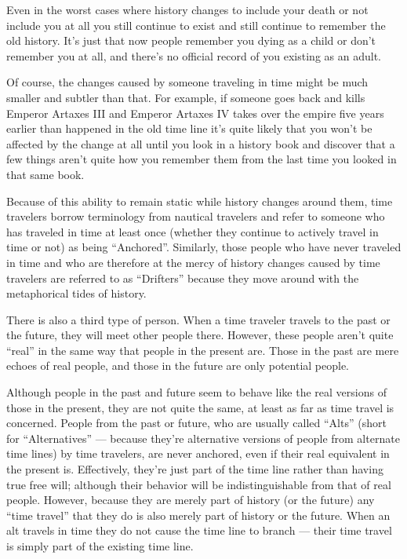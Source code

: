 \begin{multicols*}{2}
Even in the worst cases where history changes to include your death or not include you at all you still continue to exist and still continue to remember the old history. It’s just that now people remember you dying as a child or don’t remember you at all, and there’s no official record of you existing as an adult.

Of course, the changes caused by someone traveling in time might be much smaller and subtler than that. For example, if someone goes back and kills Emperor Artaxes III and Emperor Artaxes IV takes over the empire five years earlier than happened in the old time line it’s quite likely that you won’t be affected by the change at all until you look in a history book and discover that a few things aren’t quite how you remember them from the last time you looked in that same book.

Because of this ability to remain static while history changes around them, time travelers borrow terminology from nautical travelers and refer to someone who has traveled in time at least once (whether they continue to actively travel in time or not) as being “Anchored”. Similarly, those people who have never traveled in time and who are therefore at the mercy of history changes caused by time travelers are referred to as “Drifters” because they move around with the metaphorical tides of history. 

There is also a third type of person. When a time traveler travels to the past or the future, they will meet other people there. However, these people aren’t quite “real” in the same way that people in the present are. Those in the past are mere echoes of real people, and those in the future are only potential people. 

Although people in the past and future seem to behave like the real versions of those in the present, they are not quite the same, at least as far as time travel is concerned. People from the past or future, who are usually called “Alts” (short for “Alternatives” — because they’re alternative versions of people from alternate time lines) by time travelers, are never anchored, even if their real equivalent in the present is. Effectively, they’re just part of the time line rather than having true free will; although their behavior will be indistinguishable from that of real people. However, because they are merely part of history (or the future) any “time travel” that they do is also merely part of history or the future. When an alt travels in time they do not cause the time line to branch — their time travel is simply part of the existing time line.


\end{multicols*}
